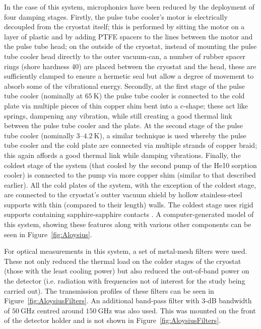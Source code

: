 In the case of this system, microphonics have been reduced by the deployment of four damping stages. Firstly, the pulse tube cooler's motor is electrically decoupled from the cryostat itself; this is performed by sitting the motor on a layer of plastic and by adding PTFE spacers to the lines between the motor and the pulse tube head; on the outside of the cryostat, instead of mounting the pulse tube cooler head directly to the outer vacuum-can, a number of rubber spacer rings (shore hardness 40) are placed between the cryostat and the head, these are sufficiently clamped to ensure a hermetic seal but allow a degree of movement to absorb some of the vibrational energy. Secondly, at the first stage of the pulse tube cooler (nominally at $65~\mathrm{K}$) the pulse tube cooler is connected to the cold plate via multiple pieces of thin copper shim bent into a c-shape; these act like springs, dampening any vibration, while still creating a good thermal link between the pulse tube cooler and the plate. At the second stage of the pulse tube cooler (nominally $3\mbox{--}4.2~\mathrm{K}$), a similar technique is used whereby the pulse tube cooler and the cold plate are connected via multiple strands of copper braid; this again affords a good thermal link while damping vibrations. Finally, the coldest stage of the system (that cooled by the second  pump of the He10 sorption cooler) is connected to the pump via more copper shim (similar to that described earlier). All the cold plates of the system, with the exception of the coldest stage, are connected to the cryostat's outter vacuum shield by hollow stainless-steel supports with thin (compared to their length) walls. The coldest stage uses rigid supports containing sapphire-sapphire contacts \parencite[these have been described by][]{Bintley2007}. A computer-generated model of this system, showing these features along with various other components can be seen in Figure~\ref{fig:Aloysius}.
\par 
For optical measurements in this system, a set of metal-mesh filters \parencite[as described by][]{Ade2006} were used. These not only reduced the thermal load on the colder stages of the cryostat (those with the least cooling power) but also reduced the out-of-band power on the detector (i.e. radiation with frequencies not of interest for the study being carried out). The transmission profiles of these filters can be seen in Figure~\ref{fig:AloysiusFilters}. An additional band-pass filter with 3-dB bandwidth of $50~\mathrm{GHz}$ centred around $150~\mathrm{GHz}$ was also used. This was mounted on the front of the detector holder and is not shown in Figure~\ref{fig:AloysiusFilters}.
%
